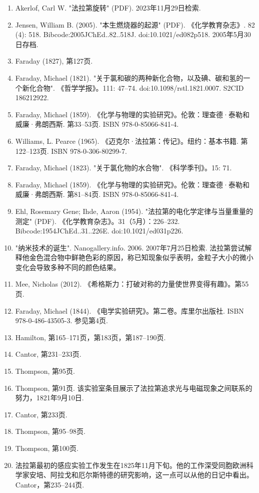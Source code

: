 \begin{enumerate}
\item Akerlof, Carl W. "法拉第旋转" (PDF). 2023年11月29日检索.
\item Jensen, William B. (2005). "本生燃烧器的起源" (PDF). 《化学教育杂志》. 82 (4): 518. Bibcode:2005JChEd..82..518J. doi:10.1021/ed082p518. 2005年5月30日存档.
\item Faraday (1827), 第127页.
\item Faraday, Michael (1821). "关于氯和碳的两种新化合物，以及碘、碳和氢的一个新化合物". 《哲学学报》。111: 47–74. doi:10.1098/rstl.1821.0007. S2CID 186212922.
\item Faraday, Michael (1859). 《化学与物理的实验研究》。伦敦：理查德·泰勒和威廉·弗朗西斯. 第33–53页. ISBN 978-0-85066-841-4.
\item Williams, L. Pearce (1965). 《迈克尔·法拉第：传记》。纽约：基本书籍. 第122–123页. ISBN 978-0-306-80299-7.
\item Faraday, Michael (1823). "关于氯化物的水合物". 《科学季刊》。15: 71.
\item Faraday, Michael (1859). 《化学与物理的实验研究》。伦敦：理查德·泰勒和威廉·弗朗西斯. 第81–84页. ISBN 978-0-85066-841-4.
\item Ehl, Rosemary Gene; Ihde, Aaron (1954). "法拉第的电化学定律与当量重量的测定" (PDF). 《化学教育杂志》。31（5月）：226–232. Bibcode:1954JChEd..31..226E. doi:10.1021/ed031p226.
\item "纳米技术的诞生". Nanogallery.info. 2006. 2007年7月25日检索. 法拉第尝试解释他金色混合物中鲜艳色彩的原因，称已知现象似乎表明，金粒子大小的微小变化会导致多种不同的颜色结果。
\item Mee, Nicholas (2012). 《希格斯力：打破对称的力量使世界变得有趣》。第55页.
\item Faraday, Michael (1844). 《电学实验研究》。第二卷。库里尔出版社. ISBN 978-0-486-43505-3. 参见第4页.
\item Hamilton, 第165–171页，第183页，第187–190页.
\item Cantor, 第231–233页.
\item Thompson, 第95页.
\item Thompson, 第91页. 该实验室条目展示了法拉第追求光与电磁现象之间联系的努力，1821年9月10日.
\item Cantor, 第233页.
\item Thompson, 第95–98页.
\item Thompson, 第100页.
\item 法拉第最初的感应实验工作发生在1825年11月下旬。他的工作深受同胞欧洲科学家安培、阿拉戈和厄尔斯特德的研究影响，这一点可以从他的日记中看出。Cantor，第235–244页.

\end{enumerate}
